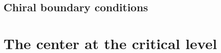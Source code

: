 \documentclass[12pt,letterpaper,reqno]{amsart}
\numberwithin{equation}{section}
\newcommand{\cM}{\ensuremath{\mathcal M}}
\newcommand{\bbC}{\ensuremath{\mathbb C}}
\newcommand{\vrep}{\mathcal{R}}
\newcommand{\IP}[1]{\langle#1\rangle}
\newcommand{\CS}{\textrm{CS}}
\newcommand{\ti}[1]{\textit{#1}}
\DeclareMathOperator{\Tr}{Tr}
\DeclareRobustCommand{\fixme}[1]{\leavevmode{\color{orange}[#1]}}
\begin{document}



\subsection{Chiral boundary conditions} \fixme{...}







\section{The center at the critical level}
\end{document}
